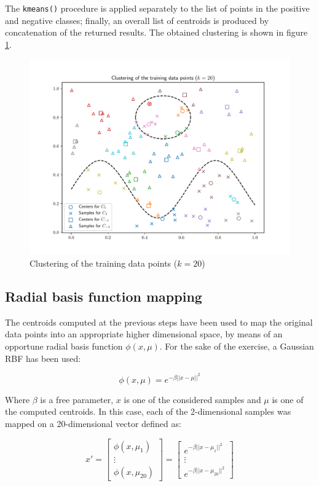 \documentclass[letterpaper,headings=standardclasses]{scrartcl}
\begin{document}
The \texttt{kmeans()} procedure is applied separately to the list of points in the positive and negative classes; finally, an overall list of centroids is produced by concatenation of the returned results. The obtained clustering is shown in figure \ref{data_20}.

\begin{figure}[h]
    \centering
    \includegraphics[width=0.7\linewidth]{data_20.pdf}
    \caption{Clustering of the training data points ($k = 20$)}
    \label{data_20}
\end{figure}

\subsection{Radial basis function mapping}

The centroids computed at the previous steps have been used to map the original data points into an appropriate higher dimensional space, by means of an opportune radial basis function $\phi(x, \mu)$. For the sake of the exercise, a Gaussian RBF has been used:

$$ \phi(x, \mu) = e^{-\beta ||x - \mu||^2} $$

Where $\beta$ is a free parameter, $x$ is one of the considered samples and $\mu$ is one of the computed centroids. In this case, each of the 2-dimensional samples was mapped on a 20-dimensional vector defined as:

$$ x' = \left[ \begin{matrix} \phi(x, \mu_1) \\ \vdots \\ \phi(x, \mu_{20}) \end{matrix} \right] = \left[ \begin{matrix} e^{-\beta ||x - \mu_1||^2} \\ \vdots \\ e^{-\beta ||x - \mu_{20}||^2} \end{matrix} \right] $$
\end{document}
